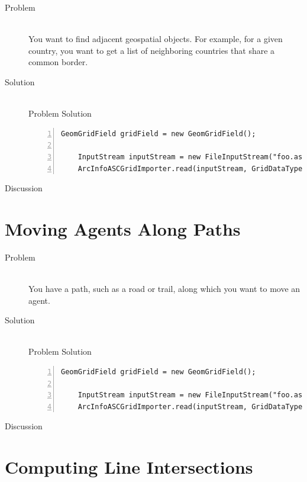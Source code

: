 \documentclass[twoside,10pt]{book}
\begin{document}
\begin{description}
\item[Problem]~\\
You want to find adjacent geospatial objects. For example, for a given
country, you want to get a list of neighboring countries that share a
common border.

\item[Solution]~\\
Problem Solution
\begin{Verbatim}[frame=lines,framesep=5mm,numbers=left,commandchars=+\[\]]
	GeomGridField gridField = new GeomGridField();
	
	InputStream inputStream = new FileInputStream("foo.asc");
	ArcInfoASCGridImporter.read(inputStream, GridDataType.INTEGER, gridField);
\end{Verbatim}

\item[Discussion ]
\end{description}


\section{Moving Agents Along Paths}
\label{sec:movingalongpaths}

\begin{description}
\item[Problem]~\\
You have a path, such as a road or trail, along which you want to move
an agent.

\item[Solution]~\\
Problem Solution
\begin{Verbatim}[frame=lines,framesep=5mm,numbers=left,commandchars=+\[\]]
	GeomGridField gridField = new GeomGridField();
	
	InputStream inputStream = new FileInputStream("foo.asc");
	ArcInfoASCGridImporter.read(inputStream, GridDataType.INTEGER, gridField);
\end{Verbatim}

\item[Discussion ]
\end{description}



\section{Computing Line Intersections}
\label{sec:lineintersection}
\end{document}
